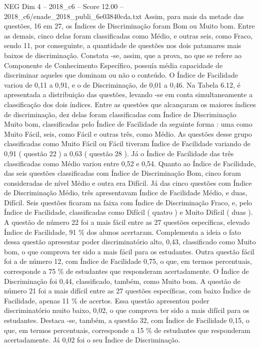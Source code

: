 \begin{textsample}{NEG Dim 4 – 2018\_c6 – Score 12.00 – 2018\_c6/enade\_2018\_publi\_6e03840cda.txt}
Assim, para mais da metade das questões, 16 em 27, os Índices de Discriminação foram Bom ou Muito bom.
Entre as demais, cinco delas foram classificadas como Médio, e outras seis, como Fraco, sendo 11, por conseguinte, a quantidade de questões nos dois patamares mais baixos de discriminação.
Constata -se, assim, que a prova, no que se refere ao Componente de Conhecimento Específico, possuía média capacidade de discriminar aqueles que dominam ou não o conteúdo.
O Índice de Facilidade variou de 0,11 a 0,91, e o de Discriminação, de 0,01 a 0,46.
Na Tabela 6.12, é apresentada a distribuição das questões, levando -se em conta simultaneamente a classificação dos dois índices.
Entre as questões que alcançaram os maiores índices de discriminação, dez delas foram classificadas com Índice de Discriminação Muito bom, classificadas pelo Índice de Facilidade da seguinte forma : uma como Muito Fácil, seis, como Fácil e outras três, como Médio.
As questões desse grupo classificadas como Muito Fácil ou Fácil tiveram Índice de Facilidade variando de 0,91 ( questão 22 ) a 0,63 ( questão 28 ).
Já o Índice de Facilidade das três classificadas como Médio variou entre 0,52 e 0,54.
Quanto ao Índice de Facilidade, das seis questões classificadas com Índice de Discriminação Bom, cinco foram consideradas de nível Médio e outra era Difícil.
Já das cinco questões com Índice de Discriminação Médio, três apresentavam Índice de Facilidade Médio, e duas, Difícil.
Seis questões ficaram na faixa com Índice de Discriminação Fraco, e, pelo Índice de Facilidade, classificadas como Difícil ( quatro ) e Muito Difícil ( duas ).
A questão de número 22 foi a mais fácil entre as 27 questões específicas, elevado Índice de Facilidade, 91 \% dos alunos acertaram.
Complementa a ideia o fato dessa questão apresentar poder discriminatório alto, 0,43, classificado como Muito bom, o que comprova ter sido a mais fácil para os estudantes.
Outra questão fácil foi a de número 12, com Índice de Facilidade 0,75, o que, em termos percentuais, corresponde a 75 \% de estudantes que responderam acertadamente.
O Índice de Discriminação foi 0,44, classificado, também, como Muito bom.
A questão de número 21 foi a mais difícil entre as 27 questões específicas, com baixo Índice de Facilidade, apenas 11 \% de acertos.
Essa questão apresentou poder discriminatório muito baixo, 0,02, o que comprova ter sido a mais difícil para os estudantes.
Destaca -se, também, a questão 32, com Índice de Facilidade 0,15, o que, em termos percentuais, corresponde a 15 \% de estudantes que responderam acertadamente.
Já 0,02 foi o seu Índice de Discriminação.

\end{textsample}
